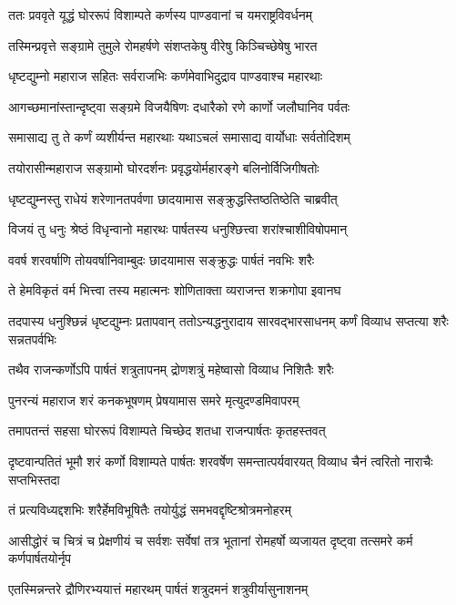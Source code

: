 \twolineshloka
{ततः प्रववृते यूद्धं घोररूपं विशाम्पते}
{कर्णस्य पाण्डवानां च यमराष्ट्रविवर्धनम्}


\twolineshloka
{तस्मिन्प्रवृत्ते सङ्ग्रामे तुमुले रोमहर्षणे}
{संशप्तकेषु वीरेषु किञ्चिच्छेषेषु भारत}


\twolineshloka
{धृष्टद्युम्नो महाराज सहितः सर्वराजभिः}
{कर्णमेवाभिदुद्राव पाण्डवाश्च महारथाः}


\twolineshloka
{आगच्छमानांस्तान्दृष्ट्वा सङ्ग्रमे विजयैषिणः}
{दधारैको रणे कार्णो जलौघानिव पर्वतः}


\twolineshloka
{समासाद्य तु ते कर्णं व्यशीर्यन्त महारथाः}
{यथाऽचलं समासाद्य वार्योधाः सर्वतोदिशम्}


\twolineshloka
{तयोरासीन्महाराज सङ्ग्रामो घोरदर्शनः}
{प्रवृद्धयोर्महारङ्गे बलिनोर्विजिगीषतोः}


\twolineshloka
{धृष्टद्युम्नस्तु राधेयं शरेणानतपर्वणा}
{छादयामास सङ्क्रुद्धस्तिष्ठतिष्ठेति चाब्रवीत्}


\twolineshloka
{विजयं तु धनुः श्रेष्ठं विधृन्वानो महारथः}
{पार्षतस्य धनुश्छित्त्वा शरांश्चाशीविषोपमान्}


\twolineshloka
{ववर्ष शरवर्षाणि तोयवर्षानिवाम्बुदः}
{छादयामास सङ्क्रुद्धः पार्षतं नवभिः शरैः}


\twolineshloka
{ते हेमविकृतं वर्म भित्त्वा तस्य महात्मनः}
{शोणिताक्ता व्यराजन्त शक्रगोपा इवानघ}


\threelineshloka
{तदपास्य धनुश्छिन्नं धृष्टद्युम्नः प्रतापवान्}
{ततोऽन्यद्धनुरादाय सारवद्भारसाधनम्}
{कर्णं विव्याध सप्तत्या शरैः सन्नतपर्वभिः}


\twolineshloka
{तथैव राजन्कर्णोऽपि पार्षतं शत्रुतापनम्}
{द्रोणशत्रुं महेष्वासो विव्याध निशितैः शरैः}


\twolineshloka
{पुनरन्यं महाराज शरं कनकभूषणम्}
{प्रेषयामास समरे मृत्युदण्डमिवापरम्}


\twolineshloka
{तमापतन्तं सहसा घोररूपं विशाम्पते}
{चिच्छेद शतधा राजन्पार्षतः कृतहस्तवत्}


दृष्टवान्पतितं भूमौ शरं कर्णो विशाम्पते
\twolineshloka
{पार्षतः शरवर्षेण समन्तात्पर्यवारयत्}
{विव्याध चैनं त्वरितो नाराचैः सप्तभिस्तदा}


\twolineshloka
{तं प्रत्यविध्यद्दशभिः शरैर्हेमविभूषितैः}
{तयोर्युद्धं समभवद्दृष्टिश्रोत्रमनोहरम्}


आसीद्धोरं च चित्रं च प्रेक्षणीयं च सर्वशः
\twolineshloka
{सर्वेषां तत्र भूतानां रोमहर्षो व्यजायत}
{दृष्ट्वा तत्समरे कर्म कर्णपार्षतयोर्नृप}


\twolineshloka
{एतस्मिन्नन्तरे द्रौणिरभ्ययात्तं महारथम्}
{पार्षतं शत्रुदमनं शत्रुवीर्यासुनाशनम्}


